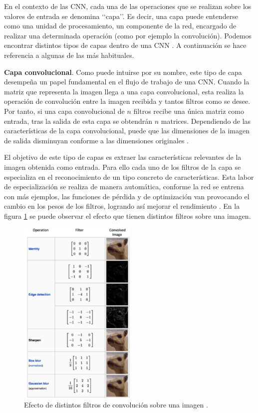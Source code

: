 En el contexto de las CNN, cada una de las operaciones que se realizan sobre los valores de entrada se denomina \lq\lq capa\rq\rq. Es decir, una capa puede entenderse como una unidad de procesamiento, un componente de la red, encargado de realizar una determinada operación (como por ejemplo la convolución). Podemos encontrar distintos tipos de capas dentro de una CNN \cite{cnn:gu}. A continuación se hace referencia a algunas de las más habituales.

\textbf{Capa convolucional}. Como puede intuirse por su nombre, este tipo de capa desempeña un papel fundamental en el flujo de trabajo de una CNN. Cuando la matriz que representa la imagen llega a una capa convolucional, esta realiza la operación de convolución entre la imagen recibida y tantos filtros como se desee. Por tanto, si una capa convolucional de $n$ filtros recibe una única matriz como entrada, tras la salida de esta capa se obtendrán $n$ matrices. Dependiendo de las características de la capa convolucional, puede que las dimensiones de la imagen de salida disminuyan conforme a las dimensiones originales \cite{cnn:osea, cnn:gu}. 

El objetivo de este tipo de capas es extraer las características relevantes de la imagen obtenida como entrada. Para ello cada uno de los filtros de la capa se especializa en el reconocimiento de un tipo concreto de características. Esta labor de especialización se realiza de manera automática, conforme la red se entrena con más ejemplos, las funciones de pérdida y de optimización van provocando el cambio en los pesos de los filtros, logrando así mejorar el rendimiento \cite{cnn:biblia_deeplearning, cnn:osea}. En la figura \ref{fig:filtros} se puede observar el efecto que tienen distintos filtros sobre una imagen.

\begin{figure}[h]
    \centering
    \includegraphics[width=0.5\textwidth]{img/filtros.png}
    \caption{Efecto de distintos filtros de convolución sobre una imagen \cite{cnn:ieee}.}
    \label{fig:filtros}
\end{figure}

